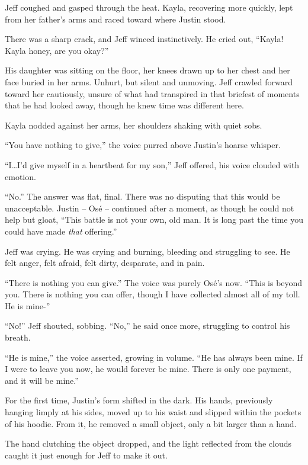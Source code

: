 Jeff coughed and gasped through the heat.  Kayla, recovering more quickly, lept from her father's arms and raced toward where Justin stood.

There was a sharp crack, and Jeff winced instinctively.  He cried out, ``Kayla!  Kayla honey, are you okay?''

His daughter was sitting on the floor, her knees drawn up to her chest and her face buried in her arms.  Unhurt, but silent and unmoving.  Jeff crawled forward toward her cautiously, unsure of what had transpired in that briefest of moments that he had looked away, though he knew time was different here.

Kayla nodded against her arms, her shoulders shaking with quiet sobs.

``You have nothing to give,'' the voice purred above Justin's hoarse whisper.

``I\ldots{}I'd give myself in a heartbeat for my son,'' Jeff offered, his voice clouded with emotion.

``No.''  The answer was flat, final.  There was no disputing that this would be unacceptable.  Justin -- Os\'e -- continued after a moment, as though he could not help but gloat, ``This battle is not your own, old man.  It is long past the time you could have made \textit{that} offering.''

Jeff was crying.  He was crying and burning, bleeding and struggling to see.  He felt anger, felt afraid, felt dirty, desparate, and in pain.

``There is nothing you can give.''  The voice was purely Os\'e's now.  ``This is beyond you.  There is nothing you can offer, though I have collected almost all of my toll.  He is mine-''

``No!'' Jeff shouted, sobbing.  ``No,'' he said once more, struggling to control his breath.

``He is mine,'' the voice asserted, growing in volume.  ``He has always been mine.  If I were to leave you now, he would forever be mine.  There is only one payment, and it will be mine.''

For the first time, Justin's form shifted in the dark.  His hands, previously hanging limply at his sides, moved up to his waist and slipped within the pockets of his hoodie. From it, he removed a small object, only a bit larger than a hand.

The hand clutching the object dropped, and the light reflected from the clouds caught it just enough for Jeff to make it out.

